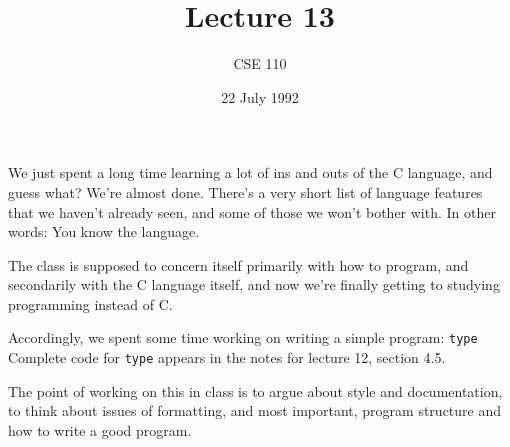 %
%
%


\def\brac#1{$<$#1$>$}
\def\Int{{\tt int}}
\def\int{\brac{\Int}}
\def\int{\brac{\Int}}
\def\Shortint{{\tt short~int}}
\def\shortint{\brac{\Shortint}}
\def\Longint{{\tt long~int}}
\def\longint{\brac{\Longint}}
\def\Float{{\tt float}}
\def\float{\brac{\Float}}
\def\Double{{\tt double}}
\def\double{\brac{\Double}}
\def\Char{{\tt char}}
\def\chr{\brac{\Char}}
\def\Void{{\tt void}}
\def\void{\brac{\Void}}

\def\ptr#1{pointer~to #1}
\def\p2#1{\brac{\ptr#1}}
\def\Ano#1#2{array~of {#1}~#2s}
\def\ano#1#2{\brac{\Ano#1#2}}
\def\Ao#1{array~of #1}
\def\ao#1{\brac{\Ao#1}}

\def\np{{\tt NULL} pointer}

\def\breakhere{\mbox{$\otimes$}}
\parskip 8pt


\title{Lecture 13}
\author{CSE 110}
\date{22 July 1992}

\pagestyle{fancy}
\rhead{\thepage}
\cfoot{}





\maketitle

We just spent a long time learning a lot of ins and outs of the C
language, and guess what?  We're almost done.  There's a very short list
of language features that we haven't already seen, and some of those we
won't bother with.  In other words:  You know the language.

The class is supposed to concern itself primarily with how to program,
and secondarily with the C language itself, and now we're finally
getting to studying programming instead of C.

Accordingly, we spent some time working on writing a simple program:
{\tt type} Complete code for {\tt type} appears in the notes for lecture
12, section 4.5.

The point of working on this in class is to argue about style and
documentation, to think about issues of formatting, and most important,
program structure and how to write a good program.  

